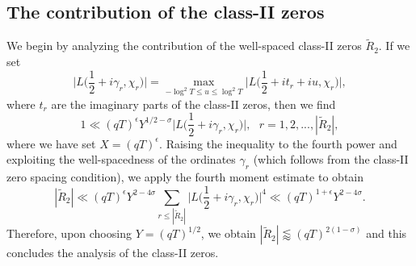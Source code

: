 \documentclass[12pt]{amsart}
\theoremstyle{definition}
\theoremstyle{plain}
\theoremstyle{remark}
\numberwithin{equation}{section}
\numberwithin{theorem}{section}
\numberwithin{equation}{section}
\begin{document}
	\subsection{The contribution of the class-II zeros}
	\label{TconclassII}
	We begin by analyzing the contribution of the well-spaced class-II zeros $\tilde{R}_{2}$. If we set 
	\begin{equation*} 
		\bigg|L\bigg(\frac{1}{2}+i\gamma_r, \chi_{r}\bigg)\bigg|=\max_{-\log ^{2} T\leq u \leq \log ^{2} T}\bigg|L\bigg(\frac{1}{2}+it_{r} +iu,\chi_{r}\bigg)\bigg|,
	\end{equation*}
	where $t_r$ are the imaginary parts of the class-II zeros, then we find
	\begin{equation*} 1 \ll (qT)^{\epsilon} Y^{1/2-\sigma} \bigg|L\bigg(\frac{1}{2}+i\gamma_{r},\chi_{r}\bigg)\bigg|,\ \ \ r=1,2, ... ,|\tilde{R}_{2}|,
	\end{equation*}
	where we have set $X = (qT)^{\epsilon}$. Raising the inequality to the fourth power and exploiting the well-spacedness of the ordinates $\gamma_{r}$ (which follows from the class-II zero spacing condition), we apply the fourth moment estimate \cite[Theorem 10.3]{MontgomeryBook} to obtain 
	\begin{equation*} 
		|\tilde{R}_{2}| \ll (qT)^{\epsilon} Y^{2-4 \sigma} \sum_{r \leq |\tilde{R}_{2}|} \bigg|L\bigg(\frac{1}{2}+i\gamma_{r},\chi_r\bigg)\bigg|^{4} \ll (qT)^{1+\epsilon}Y^{2-4\sigma}.
	\end{equation*} 
	Therefore, upon choosing $Y=(qT)^{1/2}$, we obtain $|\tilde{R}_2| \lessapprox (qT)^{2(1-\sigma)}$ and this concludes the analysis of the class-II zeros.
	
	
\end{document}
